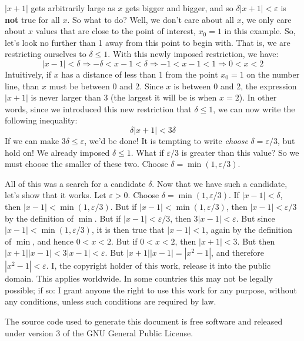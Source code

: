 \documentclass{article}
\theoremstyle{normal}
\begin{document}
    $|x+1|$ gets arbitrarily large as $x$ gets bigger and bigger, and so
    $\delta|x+1|<\varepsilon$ is \textbf{not} true for all $x$. So what to do?
    Well, we don't care about all $x$, we only care about $x$ values that are
    close to the point of interest, $x_{0}=1$ in this example. So, let's
    look no further than 1 away from this point to begin with. That is, we are
    restricting ourselves to $\delta\leq{1}$. With this newly imposed
    restriction, we have:
    \begin{equation}
        |x-1|<\delta\Rightarrow-\delta<x-1<\delta
        \Rightarrow-1<x-1<1\Rightarrow0<x<2
    \end{equation}
    Intuitively, if $x$ has a distance of less than 1 from the point
    $x_{0}=1$ on the number line, than $x$ must be between 0 and 2. Since
    $x$ is between 0 and 2, the expression $|x+1|$ is never larger than 3
    (the largest it will be is when $x=2$). In other words, since we
    introduced this new restriction that $\delta\leq{1}$, we can now write the
    following inequality:
    \begin{equation}
        \delta|x+1|<3\delta
    \end{equation}
    If we can make $3\delta\leq{\varepsilon}$, we'd be done! It is tempting to
    write \textit{choose} $\delta=\varepsilon/3$, but hold on! We already
    imposed $\delta\leq{1}$. What if $\varepsilon/3$ is greater than this
    value? So we must choose the smaller of these two.
    Choose $\delta=\min(1,\varepsilon/3)$.
    \par\hfill\par
    All of this was a search for a candidate $\delta$. Now that we have such
    a candidate, let's show that it works. Let $\varepsilon>0$. Choose
    $\delta=\min(1,\varepsilon/3)$. If $|x-1|<\delta$, then
    $|x-1|<\min(1,\varepsilon/3)$. But if
    $|x-1|<\min(1,\varepsilon/3)$, then $|x-1|<\varepsilon/3$ by the definition
    of $\min$. But if $|x-1|<\varepsilon/3$, then $3|x-1|<\varepsilon$. But
    since $|x-1|<\min(1,\varepsilon/3)$, it is then true that $|x-1|<1$, again
    by the definition of $\min$, and hence $0<x<2$. But if
    $0<x<2$, then $|x+1|<3$. But then $|x+1||x-1|<3|x-1|<\varepsilon$. But
    $|x+1||x-1|=|x^{2}-1|$, and therefore $|x^{2}-1|<\varepsilon$.
    \newpage
    I, the copyright holder of this work, release it into the public domain.
    This applies worldwide. In some countries this may not be legally possible;
    if so: I grant anyone the right to use this work for any purpose, without
    any conditions, unless such conditions are required by law.
    \par\hfill\par
    The source code used to generate this document is free software and released
    under version 3 of the GNU General Public License.
\end{document}
